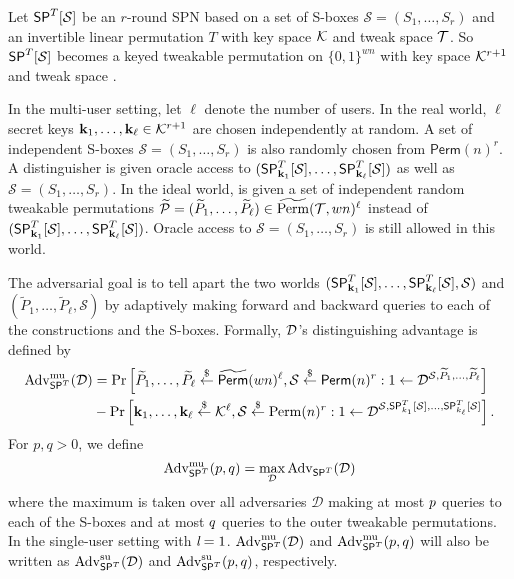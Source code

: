 \arrangespace

{}
%
Let $\mathsf{SP}^T[\mathcal{S}]$ be an $r$-round SPN based on a set of S-boxes $\mathcal{S}=(S_1, \ldots  ,S_r)$ and an invertible linear permutation $T$ with key space $\mathcal{K}$ and tweak space $\mathcal{T}$. So $\mathsf{SP}^T[\mathcal{S}]$
becomes a keyed tweakable permutation on $\{0, 1\}^{wn}$ with key space $\mathcal{K}^{r+1}$ and tweak space \calT.


In the multi-user setting, let $\ell$ denote the number of users. In the real
world, $\ell$ secret keys $\mathbf{k}_1,\ldots,\mathbf{k}_\ell\in\mathcal{K}^{r+1}$ are chosen independently at random.
A set of independent S-boxes $\mathcal{S}=(S_1,\ldots,S_r)$ is also randomly chosen from $\textsf{Perm}(n)^r$. A distinguisher \dis is given oracle access to $(\mathsf{SP}_{\mathbf{k}_1}^T[\mathcal{S}],\ldots,\mathsf{SP}_{\mathbf{k}_\ell}^T[\mathcal{S}])$ as
well as $\mathcal{S}=(S_1,\ldots,S_r)$. In the ideal world, \dis is given a set of independent
random tweakable permutations $\widetilde{\mathcal{P}}=(\widetilde{P}_1,\ldots,\widetilde{P}_{\ell})\in\widetilde{\operatorname{Perm}}(\mathcal{T},wn)^\ell$ instead of $(\mathsf{SP}_{\mathbf{k}_1}^T[\mathcal{S}],\ldots,\mathsf{SP}_{\mathbf{k}_\ell}^T[\mathcal{S}])$. Oracle access to $\mathcal{S}=(S_1,\ldots,S_r)$ is still allowed in this world.


The adversarial goal is to tell apart the two worlds $(\mathsf{SP}_{\mathbf{k}_1}^T[\mathcal{S}],\ldots,\mathsf{SP}_{\mathbf{k}_\ell}^T[\mathcal{S}],\mathcal{S})$ and $(\widetilde{P}_1,\ldots,\widetilde{P}_{\ell},\mathcal{S})$ by adaptively making forward and backward queries to each
of the constructions and the S-boxes. Formally, $\mathcal{D}$'s distinguishing advantage is
defined by
%
$$
\begin{aligned}
\operatorname{Adv}_{\mathsf{SP}^T}^{\mathrm{mu}}(\mathcal{D}) &=\operatorname{Pr}\left[\widetilde{P}_1,\ldots,\widetilde{P}_{\ell} \stackrel{\$}{\leftarrow} \widetilde{\mathsf{Perm}}(w n)^\ell, \mathcal{S} \stackrel{\$}{\leftarrow} \mathsf{Perm}(n)^{r}: 1 \leftarrow \mathcal{D}^{\mathcal{S}, \widetilde{P}_{1}, \ldots, \widetilde{P}_{\ell}}\right] \\
&-\operatorname{Pr}\left[\mathbf{k}_{1}, \ldots, \mathbf{k}_{\ell} \stackrel{\$}{\leftarrow} \mathcal{K}^{\ell}, \mathcal{S} \stackrel{\$}{\leftarrow} \operatorname{Perm}(n)^{r}: 1 \leftarrow \mathcal{D}^{\mathcal{S}, \mathsf{SP}_{k_{1}}^T[\mathcal{S}], \ldots, \mathsf{SP}_{k_{\ell}}^T[\mathcal{S}]}\right].
\end{aligned}
$$
%
For $p,q > 0$, we define
%
$$
\operatorname{Adv}^{\mathrm{mu}}_{\mathsf{SP}^T}(p, q) = \max _{\mathcal{D}} \operatorname{Adv}_{\mathsf{SP}^T}(\mathcal{D})
$$
%
where the maximum is taken over all adversaries $\mathcal{D}$ making at most $\mathnormal{p}$ queries to each of the S-boxes and at most $\mathnormal{q}$ queries to the outer tweakable permutations. In the single-user setting with $\emph{l} = 1$. $\operatorname{Adv}^{\mathrm{mu}}_{\mathsf{SP}^T}(\mathcal{D})$ and $\operatorname{Adv}^{\mathrm{mu}}_{\mathsf{SP}^T}(p, q)$  will also be written as $\operatorname{Adv}^{\mathrm{su}}_{\mathsf{SP}^T}(\mathcal{D})$ and $\operatorname{Adv}^{\mathrm{su}}_{\mathsf{SP}^T}(p, q)$, respectively.



